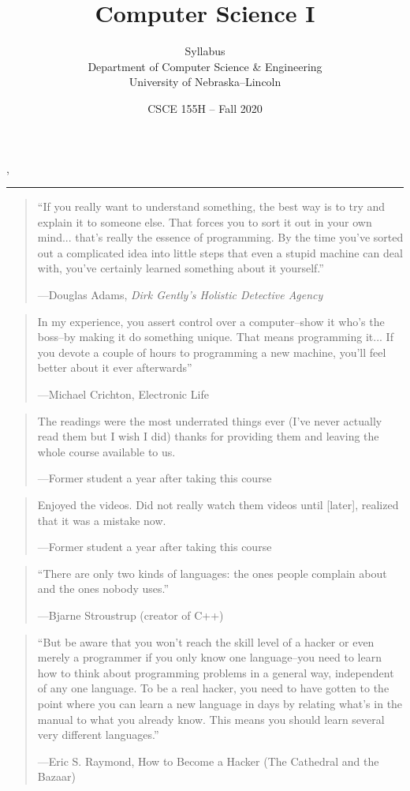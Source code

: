 \documentclass[12pt]{scrartcl}
\title{Computer Science I}\let\Title\@title
\subtitle{Syllabus\\
{\small
\vskip1cm
Department of Computer Science \& Engineering \\
University of Nebraska--Lincoln}
\vskip-1cm}
\date{CSCE 155H -- Fall 2020}
\begin{document}
\maketitle

\newwatermark[allpages=true,scale=5,textmark=Draft]{},

\hrule

\begin{quote}
``If you really want to understand something, the best way is to try and explain it to someone else. That forces you to sort it out in your own mind... that's really the essence of programming. By the time you've sorted out a complicated idea into little steps that even a stupid machine can deal with, you've certainly learned something about it yourself.'' 

\hfill ---Douglas Adams, \emph{Dirk Gently's Holistic Detective Agency}
\end{quote}

\begin{quote}
In my experience, you assert control over a computer--show it who's the boss--by making it do something unique. That means programming it... If you devote a couple of hours to programming a new machine, you'll feel better about it ever afterwards'' 

\hfill ---Michael Crichton, Electronic Life
\end{quote}

\begin{quote}
The readings were the most underrated things ever (I've never actually read them but I wish I did) thanks for providing them and leaving the whole course available to us. 

\hfill ---Former student a year after taking this course
\end{quote}

\begin{quote}
Enjoyed the videos. Did not really watch them videos until [later],
realized that it was a mistake now.

\hfill ---Former student a year after taking this course
\end{quote}

\begin{quote}
``There are only two kinds of languages: the ones people complain 
about and the ones nobody uses.''

\hfill ---Bjarne Stroustrup (creator of C++)
\end{quote}

\begin{quote}
``But be aware that you won't reach the skill level of a hacker or 
even merely a programmer if you only know one language--you need to 
learn how to think about programming problems in a general way, 
independent of any one language.  To be a real hacker, you need to 
have gotten to the point where you can learn a new language in days 
by relating what's in the manual to what you already know.  This 
means you should learn several very different languages.''

\hfill ---Eric S. Raymond, How to Become a Hacker (The Cathedral and the Bazaar)
\end{quote}
\end{document}
